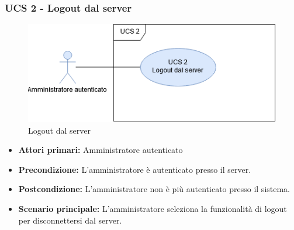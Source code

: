 \newpage

\subsubsection{UCS 2 - Logout dal server}

\begin{figure}[h]
  \centering
  \includegraphics[scale=0.6]{sezioni/UseCase/Immagini/UCS2.png}
  \caption{Logout dal server}
\end{figure}

\begin{itemize}
\item \textbf{Attori primari:} Amministratore autenticato
\item \textbf{Precondizione:} L'amministratore è autenticato presso il server.
\item \textbf{Postcondizione:} L'amministratore non è più autenticato presso il sistema.
\item \textbf{Scenario principale:} L'amministratore seleziona la funzionalità di logout per disconnettersi dal server.
\end{itemize}
